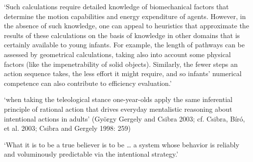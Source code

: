 \documentclass[12pt]{extarticle}
\begin{document}
\begin{multicols}{3}
`Such calculations require detailed knowledge of biomechanical factors that determine the motion capabilities and energy expenditure of agents. However, in the absence of such knowledge, one can appeal to heuristics that approximate the results of these calculations on the basis of knowledge in other domains that is certainly available to young infants. For example, the length of pathways can be assessed by geometrical calculations, taking also into account some physical factors (like the impenetrability of solid objects). Similarly, the fewer steps an action sequence takes, the less effort it might require, and so infants’ numerical competence can also contribute to efficiency evaluation.’
 
‘when taking the teleological stance one-year-olds apply the same inferential principle of rational action that drives everyday mentalistic reasoning about intentional actions in adults’
(György Gergely and Csibra 2003; cf. Csibra, Bíró, et al. 2003; Csibra and Gergely 1998: 259)
 
‘What it is to be a true believer is to be … a system whose behavior is reliably and voluminously predictable via the intentional strategy.’
\citep[p.\ 15]{Dennett:1987sf}
 
 
 
 

 
\footnotesize 


\end{multicols}
\end{document}
